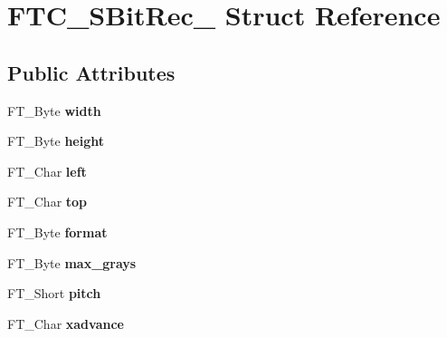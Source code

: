 \hypertarget{struct_f_t_c___s_bit_rec__}{\section{F\-T\-C\-\_\-\-S\-Bit\-Rec\-\_\- Struct Reference}
\label{struct_f_t_c___s_bit_rec__}
}
\subsection*{Public Attributes}
\begin{DoxyCompactItemize}
\item 
\hypertarget{struct_f_t_c___s_bit_rec___a5b92fb4f213a880f758bb87ac2ceb263}{F\-T\-\_\-\-Byte {\bfseries width}}\label{struct_f_t_c___s_bit_rec___a5b92fb4f213a880f758bb87ac2ceb263}

\item 
\hypertarget{struct_f_t_c___s_bit_rec___a5953efe2aded3b184875d5e5d08cafef}{F\-T\-\_\-\-Byte {\bfseries height}}\label{struct_f_t_c___s_bit_rec___a5953efe2aded3b184875d5e5d08cafef}

\item 
\hypertarget{struct_f_t_c___s_bit_rec___aef273749f4fdb9943500ec6df8412a94}{F\-T\-\_\-\-Char {\bfseries left}}\label{struct_f_t_c___s_bit_rec___aef273749f4fdb9943500ec6df8412a94}

\item 
\hypertarget{struct_f_t_c___s_bit_rec___a3e558b3a04b70f00f80b862cdc94d9a2}{F\-T\-\_\-\-Char {\bfseries top}}\label{struct_f_t_c___s_bit_rec___a3e558b3a04b70f00f80b862cdc94d9a2}

\item 
\hypertarget{struct_f_t_c___s_bit_rec___a3d3fcc2869ce5c95f0f63898e6cef8be}{F\-T\-\_\-\-Byte {\bfseries format}}\label{struct_f_t_c___s_bit_rec___a3d3fcc2869ce5c95f0f63898e6cef8be}

\item 
\hypertarget{struct_f_t_c___s_bit_rec___a83958d4649a898312de9a7274550dff9}{F\-T\-\_\-\-Byte {\bfseries max\-\_\-grays}}\label{struct_f_t_c___s_bit_rec___a83958d4649a898312de9a7274550dff9}

\item 
\hypertarget{struct_f_t_c___s_bit_rec___a1382ec014df599e706c2c1785bc18235}{F\-T\-\_\-\-Short {\bfseries pitch}}\label{struct_f_t_c___s_bit_rec___a1382ec014df599e706c2c1785bc18235}

\item 
\hypertarget{struct_f_t_c___s_bit_rec___a502a0bb69d973d2ae626a842eb9fefd3}{F\-T\-\_\-\-Char {\bfseries xadvance}}\label{struct_f_t_c___s_bit_rec___a502a0bb69d973d2ae626a842eb9fefd3}


\end{DoxyCompactItemize}

